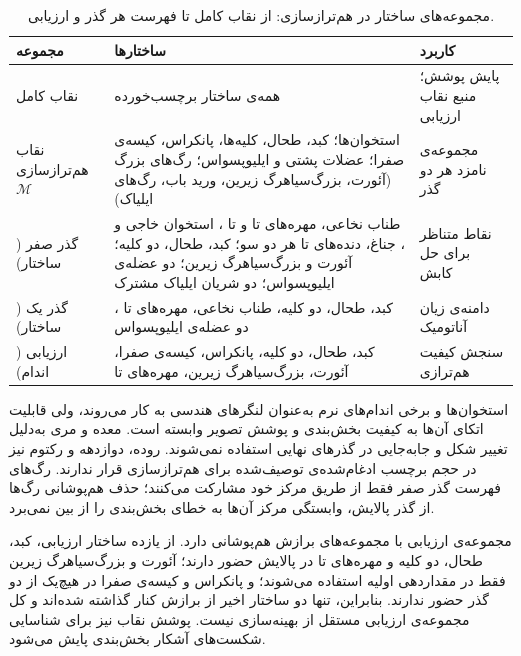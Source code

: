 \begin{table}[H]
\centering
\footnotesize
\caption{مجموعه‌های ساختار در هم‌ترازسازی: از نقاب کامل تا فهرست هر گذر و ارزیابی.}
\label{tab:reg-mask-levels}
\begin{tabular}{|R{2.6cm}|R{7.6cm}|R{3.2cm}|}
\hline
\textbf{مجموعه} & \textbf{ساختارها} & \textbf{کاربرد} \\
\hline
نقاب کامل & همه‌ی  ساختار برچسب‌خورده & پایش پوشش؛ منبع نقاب ارزیابی \\
\hline
نقاب هم‌ترازسازی $\mathcal{M}$ & استخوان‌ها؛ کبد، طحال، کلیه‌ها، پانکراس، کیسه‌ی صفرا؛ عضلات پشتی و ایلیوپسواس؛ رگ‌های بزرگ (آئورت، بزرگ‌سیاهرگ زیرین، ورید باب، رگ‌های ایلیاک) & مجموعه‌ی نامزد هر دو گذر \\
\hline
گذر صفر ( ساختار) & طناب نخاعی، مهره‌های  تا  و  تا ، استخوان خاجی و ، جناغ، دنده‌های  تا  هر دو سو؛ کبد، طحال، دو کلیه؛ آئورت و بزرگ‌سیاهرگ زیرین؛ دو عضله‌ی ایلیوپسواس؛ دو شریان ایلیاک مشترک & نقاط متناظر برای حل کابش \\
\hline
گذر یک ( ساختار) & کبد، طحال، دو کلیه، طناب نخاعی، مهره‌های  تا ، دو عضله‌ی ایلیوپسواس & دامنه‌ی زیان آناتومیک \\
\hline
ارزیابی ( اندام) & کبد، طحال، دو کلیه، پانکراس، کیسه‌ی صفرا، آئورت، بزرگ‌سیاهرگ زیرین، مهره‌های  تا  & سنجش کیفیت هم‌ترازی \\
\hline
\end{tabular}
\end{table}


استخوان‌ها و برخی اندام‌های نرم به‌عنوان لنگرهای هندسی به کار می‌روند، ولی قابلیت اتکای آن‌ها به کیفیت بخش‌بندی و پوشش تصویر وابسته است. معده و مری به‌دلیل تغییر شکل و جابه‌جایی در گذرهای نهایی استفاده نمی‌شوند. روده، دوازدهه و رکتوم نیز در حجم برچسب ادغام‌شده‌ی توصیف‌شده برای هم‌ترازسازی قرار ندارند. رگ‌های فهرست گذر صفر فقط از طریق مرکز خود مشارکت می‌کنند؛ حذف هم‌پوشانی رگ‌ها از گذر پالایش، وابستگی مرکز آن‌ها به خطای بخش‌بندی را از بین نمی‌برد.

مجموعه‌ی ارزیابی با مجموعه‌های برازش هم‌پوشانی دارد. از یازده ساختار ارزیابی، کبد، طحال، دو کلیه و مهره‌های  تا  در پالایش حضور دارند؛ آئورت و بزرگ‌سیاهرگ زیرین فقط در مقداردهی اولیه استفاده می‌شوند؛ و پانکراس و کیسه‌ی صفرا در هیچ‌یک از دو گذر حضور ندارند. بنابراین، تنها دو ساختار اخیر از برازش کنار گذاشته شده‌اند و کل مجموعه‌ی ارزیابی مستقل از بهینه‌سازی نیست. پوشش نقاب نیز برای شناسایی شکست‌های آشکار بخش‌بندی پایش می‌شود.

